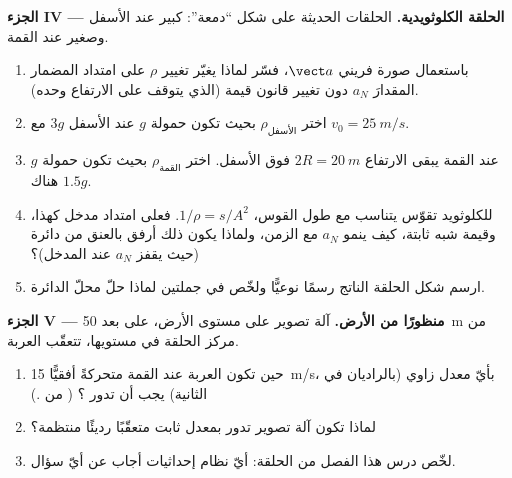 \begin{problem}
\medskip
\noindent\textbf{الجزء IV --- الحلقة الكلوثويدية.}
الحلقات الحديثة على شكل ``دمعة'':  كبير عند
الأسفل وصغير عند القمة.
\begin{enumerate}[resume]
  \item باستعمال صورة فريني  $\vect a$، فسّر لماذا يغيّر تغيير $\rho$
        على امتداد المضمار المقدارَ $a_N$ دون تغيير قانون قيمة 
        (الذي يتوقف على الارتفاع وحده).
  \item اختر $\rho_{\text{الأسفل}}$ بحيث تكون حمولة $g$ عند
        الأسفل $3g$ مع $v_0 = \qty{25}{m/s}$.
  \item عند القمة يبقى الارتفاع $2R = \qty{20}{m}$ فوق
        الأسفل. اختر $\rho_{\text{القمة}}$ بحيث تكون حمولة $g$ هناك
        $1.5g$.
  \item للكلوثويد تقوّس يتناسب مع طول القوس،
        $1/\rho = s/A^2$. فعلى امتداد مدخل كهذا، وقيمة  شبه
        ثابتة، كيف ينمو $a_N$ مع الزمن، ولماذا يكون ذلك أرفق
        بالعنق من دائرة (حيث يقفز $a_N$ عند المدخل)؟
  \item ارسم شكل الحلقة الناتج رسمًا نوعيًّا ولخّص في
        جملتين لماذا حلّ محلّ الدائرة.
\end{enumerate}

\medskip
\noindent\textbf{الجزء V --- منظورًا من الأرض.}
آلة تصوير على مستوى الأرض، على بعد \qty{50}{m} من مركز الحلقة في
مستويها، تتعقّب العربة.
\begin{enumerate}[resume]
  \item حين تكون العربة عند القمة متحركةً أفقيًّا 
        \qty{15}{m/s}، بأيّ معدل زاوي (بالراديان في الثانية) يجب أن تدور ؟
        ( من .)
  \item لماذا تكون آلة تصوير تدور بمعدل ثابت متعقّبًا رديئًا
         منتظمة؟
  \item لخّص درس هذا الفصل من الحلقة: أيّ نظام إحداثيات
        أجاب عن أيّ سؤال.
\end{enumerate}
\end{problem}

